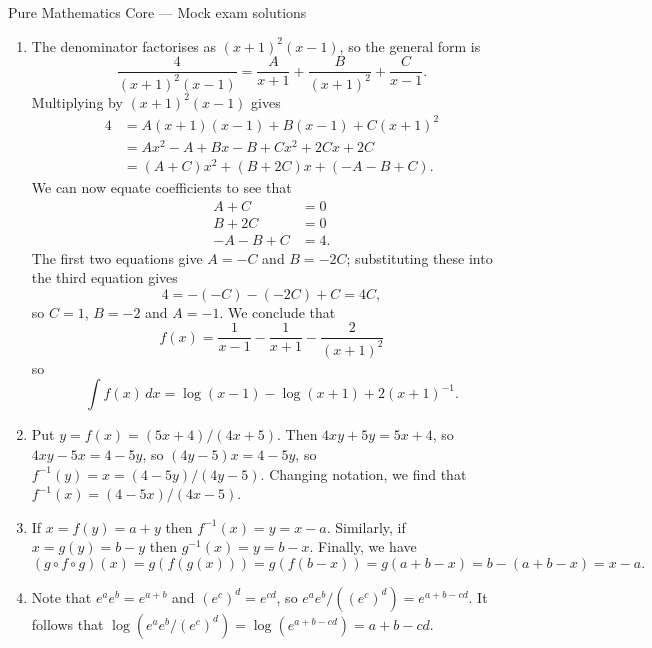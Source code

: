\documentclass{amsart}
\renewcommand{\:}       {\colon}
\begin{document}

\begin{center}
{\Large Pure Mathematics Core --- Mock exam solutions}
\end{center}

\renewcommand{\theenumi}{A\arabic{enumi}}
\begin{enumerate}
 \item %
  The denominator factorises as $(x+1)^2(x-1)$, so the general form is 
  \[ \frac{4}{(x+1)^2(x-1)} = 
     \frac{A}{x+1} + \frac{B}{(x+1)^2} + \frac{C}{x-1}.
  \]
  Multiplying by $(x+1)^2(x-1)$ gives
  \begin{align*}
    4 &= A(x+1)(x-1) + B(x-1) + C(x+1)^2 \\
      &= Ax^2 - A + Bx - B + Cx^2 +2Cx + 2C \\
      &= (A+C)x^2 + (B+2C)x + (-A-B+C). 
  \end{align*}
  We can now equate coefficients to see that
  \begin{align*}
   A+C  &= 0 \\
   B+2C &= 0 \\
   -A-B+C &= 4.
  \end{align*}
  The first two equations give $A=-C$ and $B=-2C$; substituting these
  into the third equation gives
  \[ 4 = -(-C) - (-2C) + C = 4C, \]
  so $C=1$, $B=-2$ and $A=-1$.  We conclude that
  \[ f(x) = \frac{1}{x-1} - \frac{1}{x+1} - \frac{2}{(x+1)^2} \]
  so
  \[ \int f(x)\,dx = \log(x-1) - \log(x+1) + 2(x+1)^{-1}. \]

 \item %
  Put $y=f(x)=(5x+4)/(4x+5)$.  Then $4xy+5y=5x+4$, so $4xy-5x=4-5y$,
  so $(4y-5)x=4-5y$, so $f^{-1}(y)=x=(4-5y)/(4y-5)$.  Changing
  notation, we find that $f^{-1}(x)=(4-5x)/(4x-5)$.

 \item %
  If $x=f(y)=a+y$ then $f^{-1}(x)=y=x-a$.  Similarly, if $x=g(y)=b-y$
  then $g^{-1}(x)=y=b-x$.  Finally, we have
  \[ (g\circ f\circ g)(x) = g(f(g(x))) =
      g(f(b-x)) = g(a+b-x) = b-(a+b-x) = x-a.
  \]

 \item %
  Note that $e^ae^b=e^{a+b}$ and $(e^c)^d=e^{cd}$, so
  $e^a e^b/((e^c)^d)=e^{a+b-cd}$.  It follows that
  $\log(e^a e^b/(e^c)^d)=\log(e^{a+b-cd})=a+b-cd$.


\end{enumerate}
\end{document}
